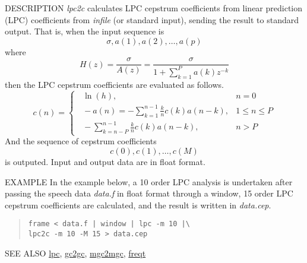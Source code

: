 \begin{synopsis}
 \item[lpc2c] [ --m $M_1$ ] [ --M $M_2$ ] [ {\em infile} ]
\end{synopsis}
\begin{qsection}{DESCRIPTION}
{\em lpc2c} calculates LPC cepstrum coefficients 
from linear prediction (LPC) coefficients 
from {\em infile} (or standard input), 
sending the result to standard output.
That is, when the input sequence is 
\begin{displaymath} 
   \sigma, a(1), a(2), \dots, a(p) 
\end{displaymath}
where
\begin{displaymath}
   H(z)=\frac{\sigma}{A(z)}=\frac{\sigma}{\displaystyle 1+\sum_{k=1}^P a(k) z^{-k}}
\end{displaymath}
then the LPC cepstrum coefficients are evaluated as follows.
\begin{displaymath}
   c(n) = \begin{cases}
 \;\; \ln(h),&n=0\\
 \;\; \displaystyle -a(n)=-\sum^{n-1}_{k=1}\frac{k}{n}c(k) a(n-k),&1\leq n\leq P\\ 
 \;\; \displaystyle -\sum_{k=n-P}^{n-1}\frac{k}{n}c(k) a(n-k),& n>P
\end{cases}
\end{displaymath}
And the sequence of cepstrum coefficients
\begin{displaymath}
   c(0), c(1), \dots, c(M)
\end{displaymath}
is outputed.
Input and output data are in float format.
\end{qsection}

\begin{options}
\end{options}

\begin{qsection}{EXAMPLE}
In the example below, a 10 order LPC analysis is undertaken after
passing the speech data {\em data.f} in float format through a window,
15 order LPC cepstrum coefficients are calculated,
and the result is written in {\em data.cep}.
\begin{quote}
 \verb!frame < data.f | window | lpc -m 10 |\!\\
 \verb!lpc2c -m 10 -M 15 > data.cep!
\end{quote}
\end{qsection}

\begin{qsection}{SEE ALSO}
\hyperlink{lpc}{lpc},
\hyperlink{gc2gc}{gc2gc},
\hyperlink{mgc2mgc}{mgc2mgc},
\hyperlink{freqt}{freqt}
\end{qsection}
